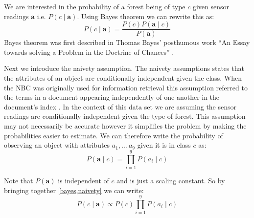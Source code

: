 We are interested in the probability of a forest being of type $c$ given sensor readings $\mathbf{a}$ i.e. $P(c \mid \mathbf{a})$.
Using Bayes theorem we can rewrite this as:
\begin{equation} \label{bayes}
	P(c \mid \mathbf{a}) = \frac{P(c)P(\mathbf{a} \mid c)}{P(\mathbf{a})}
\end{equation}
Bayes theorem was first described in Thomas Bayes' posthumous work ``An Essay towards solving a Problem in the Doctrine of Chances'' \cite{Bayes63}.

Next we introduce the naivety assumption.
The naivety assumptions states that the attributes of an object are conditionally independent given the class.
When the NBC was originally used for information retrieval this assumption referred to the terms in a document appearing independently of one another in the document's index \cite{Maron60}.
In the context of this data set we are assuming the sensor readings are conditionally independent given the type of forest.
This assumption may not necessarily be accurate however it simplifies the problem by making the probabilities easier to estimate.
We can therefore write the probability of observing an object with attributes $a_1, \dots\ a_9$ given it is in class $c$ as:
\begin{equation} \label{naivety}
	P(\mathbf{a} \mid c) = \prod_{i=1}^9 P(a_i \mid c)
\end{equation}

Note that $P(\mathbf{a})$ is independent of $c$ and is just a scaling constant.
So by bringing together \cref{bayes,naivety} we can write:
\begin{equation}
	P(c \mid \mathbf{a}) \propto P(c)\prod_{i=1}^{9}P(a_i \mid c)
\end{equation}

